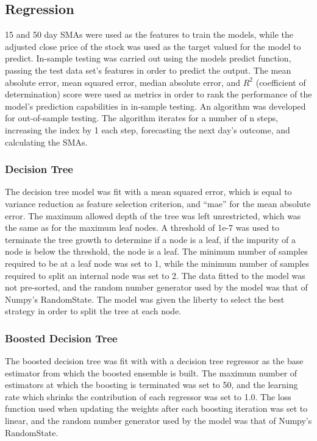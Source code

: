 \subsection{Regression}
15 and 50 day SMAs were used as the features to train the models, while the adjusted close price of the stock was used as the target valued for the model to predict. In-sample testing was carried out using the models predict function, passing the test data set's features in order to predict the output. The mean absolute error, mean squared error, median absolute error, and $R^{2}$ (coefficient of determination) score were used as metrics in order to rank the performance of the model's prediction capabilities in in-sample testing. An algorithm was developed for out-of-sample testing. The algorithm iterates for a number of n steps, increasing the index by 1 each step, forecasting the next day's outcome, and calculating the SMAs. 

\subsubsection{Decision Tree}
The decision tree model was fit with a mean squared error, which is equal to variance reduction as feature selection criterion, and “mae” for the mean absolute error. The maximum allowed depth of the tree was left unrestricted, which was the same as for the maximum leaf nodes. A threshold of 1e-7 was used to terminate the tree growth to determine if a node is a leaf, if the impurity of a node is below the threshold, the node is a leaf. The minimum number of samples required to be at a leaf node was set to 1, while the minimum number of samples required to split an internal node was set to 2. The data fitted to the model was not pre-sorted, and the random number generator used by the model was that of Numpy's RandomState. The model was given the liberty to select the best strategy in order to split the tree at each node.

\subsubsection{Boosted Decision Tree}
The boosted decision tree was fit with with a decision tree regressor as the base estimator from which the boosted ensemble is built. The maximum number of estimators at which the boosting is terminated was set to 50, and the learning rate which shrinks the contribution of each regressor was set to 1.0. The loss function used when updating the weights after each boosting iteration was set to linear, and the random number generator used by the model was that of Numpy's RandomState.


